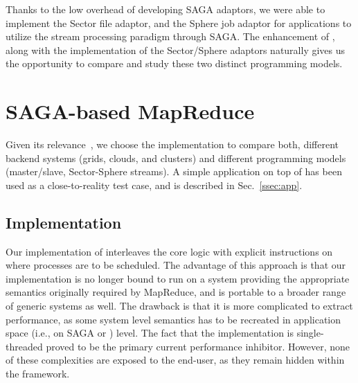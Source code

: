 \documentclass[3p,twocolumn]{elsarticle}
\begin{document}
\clearpage
Thanks to the low overhead of developing SAGA adaptors, we were able
to implement the Sector file adaptor, and the Sphere job adaptor for
applications to utilize the stream processing paradigm through SAGA.
The enhancement of \sagamapreduce, along with the implementation of the
Sector/Sphere adaptors naturally gives us the opportunity to compare
and study these two distinct programming models.


\section{SAGA-based MapReduce}
\label{sec:mr}

 Given its relevance~\cite{saga_ccgrid09}, we choose the \smr
 implementation to compare both, different backend systems (grids,
 clouds, and clusters) and different programming models (master/slave,
 Sector-Sphere streams).  A simple \wc application on top of
 \smr has been used as a close-to-reality test case, and is
 described in Sec.~\ref{ssec:app}.


\subsection{\sagamapreduce Implementation}


Our implementation of \sagamapreduce interleaves the core \mr logic
with explicit instructions on where processes are to be scheduled.
The advantage of this approach is that our implementation is no longer
bound to run on a system providing the appropriate semantics
originally required by MapReduce, and is portable to a broader range
of generic systems as well.  The drawback is that it is more
complicated to extract performance, as some system level semantics has
to be recreated in application space (i.e., on SAGA or \smr) level.
The fact that the implementation is single-threaded proved to be the
primary current performance inhibitor.  However, none of these
complexities are exposed to the end-user, as they remain hidden within
the framework. 
\end{document}
